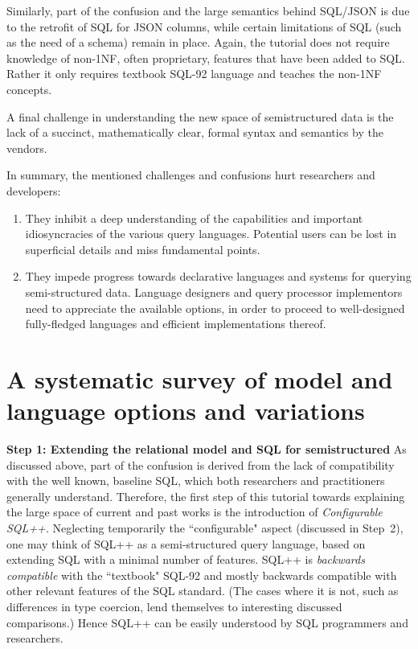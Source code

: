 Similarly, part of the confusion and the large semantics behind SQL/JSON is due to the retrofit of SQL for JSON columns, while certain limitations of SQL (such as the need of a schema) remain in place. Again, the tutorial does not require knowledge of non-1NF, often proprietary, features that have been added to SQL. Rather it only requires textbook SQL-92 language and teaches the non-1NF concepts.

A final challenge in understanding the new space of semistructured data is the lack of a succinct, mathematically clear, formal syntax and semantics by the vendors. 

In summary, the mentioned challenges and confusions hurt researchers and developers:

\begin{enumerate}
\item They inhibit a deep understanding of the capabilities and important idiosyncracies of the various query languages. Potential users can be lost in superficial details and miss fundamental points.
\item They impede progress towards declarative languages and systems for querying semi-structured data. Language designers and query processor implementors need to appreciate the available options, in order to proceed to well-designed fully-fledged languages and efficient implementations thereof. 
\end{enumerate}


\section{A systematic survey of model and language options and variations} 
\noindent \textbf{Step 1: Extending the relational model and SQL for semistructured} As discussed above, part of the confusion is derived from the lack of compatibility with the well known, baseline SQL, which both researchers and practitioners generally understand. Therefore, the first step of this tutorial towards explaining the large space of current and past works is the introduction of \emph{Configurable SQL++}. Neglecting temporarily the ``configurable" aspect (discussed in Step~2), one may think of SQL++ as a semi-structured query language, based on extending SQL with a minimal number of features. SQL++ is {\em backwards compatible} with the ``textbook" SQL-92 and mostly backwards compatible with other relevant features of the SQL standard. (The cases where it is not, such as differences in type coercion, lend themselves to interesting discussed comparisons.) Hence SQL++ can be easily understood by SQL programmers and researchers.

